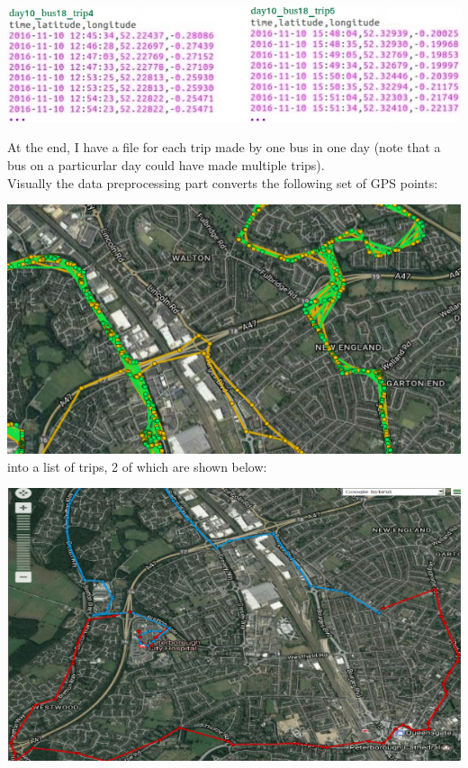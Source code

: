 \documentclass[12pt,a4paper,oneside,openright]{report}
\begin{document}
\:
\:
\:

\includegraphics[width=\textwidth]{figs/converted_format.jpg}

\newpage

At the end, I have a file for each trip made by one bus in one
day (note that a bus on a particurlar day could have made
multiple trips). \\

Visually the data preprocessing part converts the following set of GPS points:

\includegraphics[width=\textwidth]{figs/unprocessed.png} \\

into a list of trips, 2 of which are shown below:

\includegraphics[width=\textwidth]{figs/processed.png} \\
\end{document}
